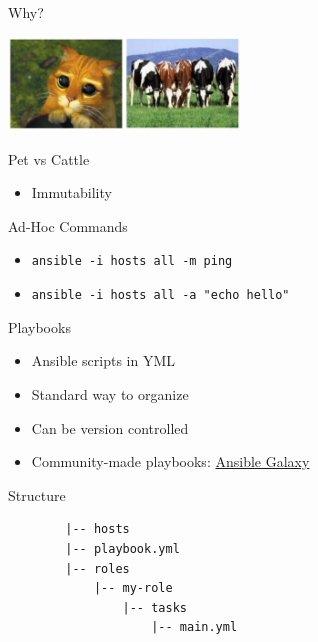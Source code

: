 \documentclass{beamer}
\begin{document}
\begin{frame}{Why?}
  \begin{center}
    \includegraphics[height=2.5cm]{images/pet_vs_cattle.jpg}
  \end{center}
  \begin{center}
    Pet vs Cattle
  \end{center}
  \pause
  \begin{itemize}
    \item Immutability %
  \end{itemize}
\end{frame}

\begin{frame}{Ad-Hoc Commands}
  \begin{itemize}
    \item {\tt ansible -i hosts all -m ping}
    \item {\tt  ansible -i hosts all -a "echo hello"}
  \end{itemize}
\end{frame}

\begin{frame}{Playbooks}
  \begin{itemize}
    \item Ansible scripts in YML
    \item Standard way to organize
    \item Can be version controlled
    \item Community-made playbooks: \href{https://galaxy.ansible.com/search}{Ansible Galaxy}
  \end{itemize}
\end{frame}

\begin{frame}[fragile]{Structure}
  \begin{exampleblock}{} {
      \begin{verbatim}
        |-- hosts
        |-- playbook.yml
        |-- roles
            |-- my-role
                |-- tasks
                    |-- main.yml
      \end{verbatim}
    }
  \end{exampleblock}
\end{frame}
\end{document}
